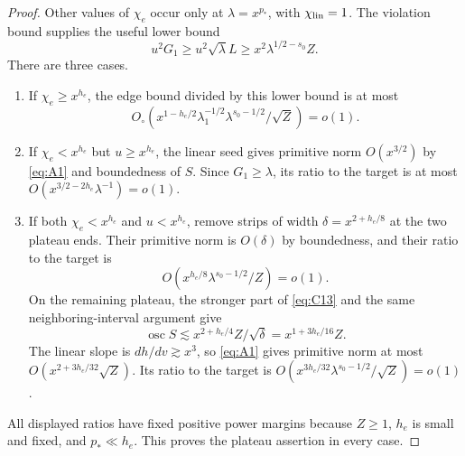 \begin{proof}
Other values of \(\chi_e\) occur only at
\(\lambda=x^{p_*}\), with \(\chi_{\rm lin}=1\).
The violation bound supplies the useful lower bound
\[
 u^2G_1\ge u^2\sqrt\lambda L
       \ge x^2\lambda^{1/2-s_0}Z.
\]
There are three cases.
\begin{enumerate}[label=(\alph*)]
\item If \(\chi_e\ge x^{h_e}\), the edge bound divided by this
lower bound is at most
\[
 O_\circ\left(
 x^{1-h_e/2}\lambda_1^{-1/2}\lambda^{s_0-1/2}/\sqrt Z\right)=o(1).
\]
\item If \(\chi_e<x^{h_e}\) but \(u\ge x^{h_e}\), the linear
seed gives primitive norm \(O(x^{3/2})\) by \eqref{eq:A1} and
boundedness of \(S\). Since \(G_1\ge\lambda\), its ratio to the
target is at most
\(O(x^{3/2-2h_e}\lambda^{-1})=o(1)\).
\item If both \(\chi_e<x^{h_e}\) and \(u<x^{h_e}\), remove
strips of width \(\delta=x^{2+h_e/8}\) at the two plateau ends.
Their primitive norm is \(O(\delta)\) by boundedness, and their
ratio to the target is
\[
 O\left(x^{h_e/8}\lambda^{s_0-1/2}/Z\right)=o(1).
\]
On the remaining plateau, the stronger part of \eqref{eq:C13}
and the same neighboring-interval argument give
\[
 \operatorname{osc}S
 \lesssim x^{2+h_e/4}Z/\sqrt\delta
 =x^{1+3h_e/16}Z.
\]
The linear slope is \(dh/dv\gtrsim x^3\), so \eqref{eq:A1}
gives primitive norm at most \(O(x^{2+3h_e/32}\sqrt Z)\).
Its ratio to the target is
\(O(x^{3h_e/32}\lambda^{s_0-1/2}/\sqrt Z)=o(1)\).
\end{enumerate}
All displayed ratios have fixed positive power margins because
\(Z\ge1\), \(h_e\) is small and fixed, and \(p_*\ll h_e\).
This proves the plateau assertion in every case.
\end{proof}


